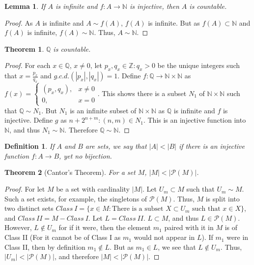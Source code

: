 \documentclass[oneside]{book}
\theoremstyle{mystyle}
\newtheorem{theorem}{Theorem}[section]
\newtheorem{definition}{Definition}[section]
\newtheorem{lemma}{Lemma}[section]
\begin{document}
\begin{lemma}
If $A$ is infinite and $f:A\rightarrow \mathbb{N}$ is injective, then $A$ is countable.
\end{lemma}
\begin{proof}
As $A$ is infinite and $A\sim f(A)$, $f(A)$ is infinite. But as $f(A)\subset \mathbb{N}$ and $f(A)$ is infinite, $f(A)\sim \mathbb{N}$. Thus, $A\sim \mathbb{N}$. 
\end{proof}

\begin{theorem}
$\mathbb{Q}$ is countable.
\end{theorem}
\begin{proof}
For each $x\in \mathbb{Q}$, $x\ne 0$, let $p_x,q_x\in\mathbb{Z}:q_x>0$ be the unique integers such that $x = \frac{p_x}{q_x}$ and $g.c.d.(|p_x|,|q_x|)=1$. Define $f:\mathbb{Q}\rightarrow \mathbb{N}\times \mathbb{N}$ as $f(x) = \begin{cases}(p_x,q_x), & x\ne 0 \\ 0, & x=0\end{cases}$. This shows there is a subset $N_1$ of $\mathbb{N}\times \mathbb{N}$ such that $\mathbb{Q}\sim N_1$. But $N_1$ is an infinite subset of $\mathbb{N}\times\mathbb{N}$ as $\mathbb{Q}$ is infinite and $f$ is injective. Define $g$ as $n+2^{n+m}:(n,m)\in N_1$. This is an injective function into $\mathbb{N}$, and thus $N_1 \sim \mathbb{N}$. Therefore $\mathbb{Q}\sim \mathbb{N}$.
\end{proof}

\begin{definition}
If $A$ and $B$ are sets, we say that $|A|<|B|$ if there is an injective function $f:A\rightarrow B$, yet no bijection.
\end{definition}

\begin{theorem}[Cantor's Theorem]
For a set $M$, $|M|<|\mathcal{P}(M)|$.
\end{theorem}
\begin{proof}
For let $M$ be a set with cardinality $|M|$. Let $U_m \subset M$ such that $U_m \sim M$. Such a set exists, for example, the singletons of $\mathcal{P}(M)$. Thus, $M$ is split into two distinct sets $Class\ I=\{x\in M: \textrm{There is a subset } X\subset U_m\textrm{ such that }x\in X\}$, and $Class\ II=M-Class\ I$. Let $L = Class\ II$. $L\subset M$, and thus $L\in \mathcal{P}(M)$. However, $L \notin U_m$ for if it were, then the element $m_1$ paired with it in $M$ is of Class II (For it cannot be of Class I as $m_1$ would not appear in $L$). If $m_1$ were in Class II, then by definition $m_1 \notin L$. But as $m_1 \in L$, we see that $L\notin U_m$. Thus, $|U_m| <|\mathcal{P}(M)|$, and therefore $|M|<|\mathcal{P}(M)|$.
\end{proof}
\end{document}
